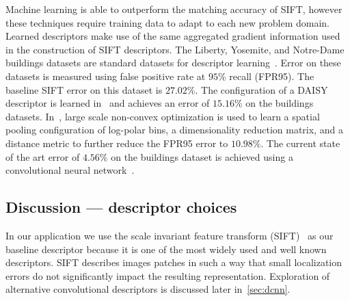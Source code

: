         Machine learning is able to outperform the matching accuracy of SIFT, however these techniques require
        training data to adapt to each new problem domain. Learned descriptors make use of the same aggregated
        gradient information used in the construction of SIFT descriptors. The Liberty, Yosemite, and Notre-Dame
        buildings datasets are standard datasets for descriptor learning~\cite{brown_discriminative_2011}. Error on
        these datasets is measured using false positive rate at $95\percent$ recall (FPR95). The baseline SIFT
        error on this dataset is $27.02\percent$. The configuration of a DAISY descriptor is learned
        in~\cite{winder_picking_2009} and achieves an error of $15.16\percent$ on the buildings datasets.
        In~\cite{simonyan_learning_2014}, large scale non-convex optimization is used to learn a spatial pooling
        configuration of log-polar bins, a dimensionality reduction matrix, and a distance metric to further reduce
        the FPR95 error to $10.98\percent$. The current state of the art error of $4.56\percent$ on the buildings
        dataset is achieved using a convolutional neural network~\cite{zagoruyko_learning_2015}.

    \subsection{Discussion --- descriptor choices}
        In our application we use the scale invariant feature transform (SIFT)~\cite{lowe_distinctive_2004} as our
        baseline descriptor because it is one of the most widely used and well known descriptors. SIFT describes
        images patches in such a way that small localization errors do not significantly impact the resulting
        representation. Exploration of alternative convolutional descriptors is discussed later in~\cref{sec:dcnn}.
